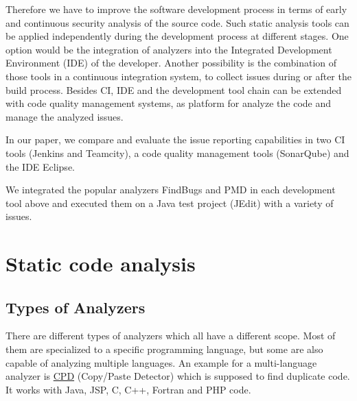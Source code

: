\documentclass[conference]{IEEEtran}
\begin{document}
Therefore we have to improve the software development process in terms of early and continuous security analysis of the source code.
Such static analysis tools can be applied independently during the development process at different stages.
One option would be the integration of analyzers into the Integrated Development Environment (IDE) of the developer.
Another possibility is the combination of those tools in a continuous integration system, to collect issues during or after the build process.
Besides CI, IDE and the development tool chain can be extended with code quality management systems, as platform for analyze the code and manage the analyzed issues.


In our paper, we compare and evaluate the issue reporting capabilities in two CI tools (Jenkins and Teamcity), a code quality management tools (SonarQube) and the IDE Eclipse.

We integrated the popular analyzers FindBugs and PMD in each development tool above and executed them on a Java test project (JEdit) with a variety of issues.








\section{Static code analysis}




\subsection{Types of Analyzers}
There are different types of analyzers which all have a different scope. Most of them are specialized to a specific programming language, but some are also capable of analyzing multiple languages. An example for a multi-language analyzer is \href{http://pmd.sourceforge.net/pmd-4.3.0/cpd.html}{CPD} (Copy/Paste Detector) which is supposed to find duplicate code. It works with Java, JSP, C, C++, Fortran and PHP code.
\end{document}
